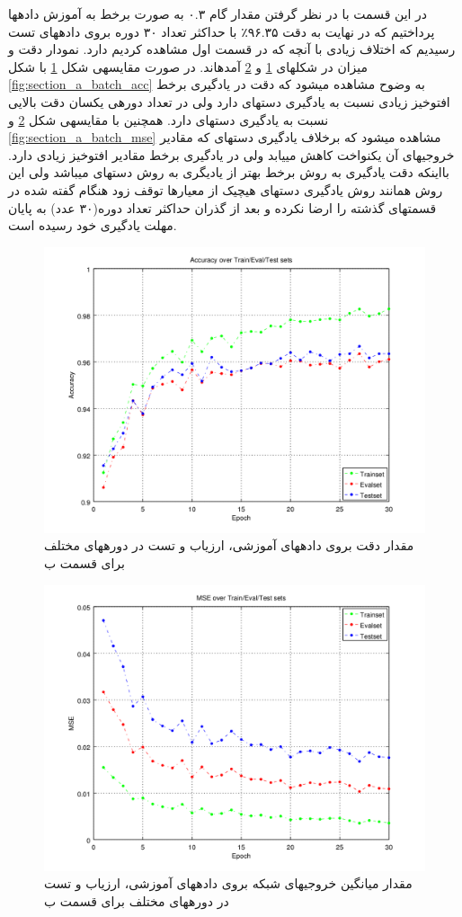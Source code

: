 \documentclass[10pt,a4paper]{article}
\newcommand{\نیمفاصله}{\halfspace}
\renewcommand{\ }{\halfspace}
\newcommand{\بپ}{انتشار-به-عقب }
\newcommand{\منست}{\lr{MNIST} }
\newcommand{\مسی}{\lr{MSE} }
\newcommand{\فوتنت}[1]{\footnote{\lr{#1}}}
\begin{document}
در این قسمت با در نظر گرفتن مقدار گام ۰.۳ به صورت برخط به آموزش داده\ ها پرداختیم که در نهایت به دقت ۹۶.۳۵٪ با حداکثر تعداد ۳۰ دوره بروی داده\ های تست رسیدیم که اختلاف زیادی با آنچه که در قسمت اول مشاهده کردیم دارد. نمودار دقت و میزان \مسی در شکل\ های
\ref{fig:section_b_online_acc} و \ref{fig:section_b_online_mse}
آمده\ اند. در صورت مقایسه\ ی شکل
\ref{fig:section_b_online_acc}
با شکل
\ref{fig:section_a_batch_acc}
به وضوح مشاهده می\ شود که دقت در یادگیری برخط افت\ وخیز زیادی نسبت به یادگیری دسته\ ای دارد ولی در تعداد دوره\ ی یکسان دقت بالایی نسبت به یادگیری دسته\ ای دارد. همچنین با مقایسه\ ی شکل
\ref{fig:section_b_online_mse} و \ref{fig:section_a_batch_mse}
مشاهده می\ شود که برخلاف یادگیری دسته\ ای که مقادیر \مسی خروجی\ های آن یک\ نواخت کاهش می\ یابد ولی در یادگیری برخط مقادیر \مسی افت\ و\ خیز زیادی دارد.
بااینکه دقت یادگیری به روش برخط بهتر از یادیگری به روش دسته\ ای می\ باشد ولی این روش همانند روش یادگیری دسته\ ای هیچ\ یک از معیارها توقف زود هنگام گفته شده در قسمت\ های گذشته را ارضا نکرده و بعد از گذران حداکثر تعداد دوره(۳۰ عدد) به پایان مهلت یادگیری خود رسیده است.
\begin{figure}
\centering
\includegraphics[width=.9\textwidth]{2_online_acc}
\caption{مقدار دقت بروی داده\ های آموزشی، ارزیاب و تست در دوره\ های مختلف برای قسمت ب}\label{fig:section_b_online_acc}
\end{figure}
\begin{figure}
\centering
\includegraphics[width=.9\textwidth]{2_online_mse}
\caption{مقدار میانگین \مسی خروجی\ های شبکه بروی داده\ های آموزشی، ارزیاب و تست در دوره\ های مختلف برای قسمت ب}\label{fig:section_b_online_mse}
\end{figure}
\end{document}
